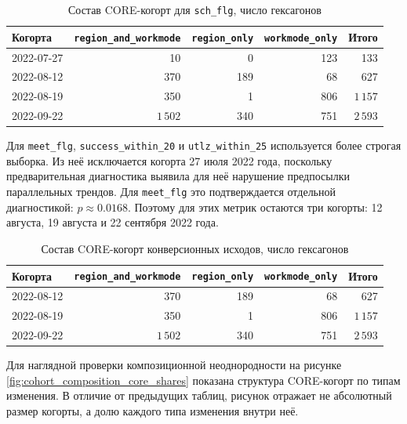\documentclass[14pt,a4paper]{extarticle}
\begin{document}
\begin{table}[H]
    \centering
    \caption{Состав CORE-когорт для \texttt{sch\_flg}, число гексагонов}
    \label{tab:cohort_composition_sch}
    \small
    \begin{tabular}{lrrrr}
        \toprule
        Когорта & \texttt{region\_and\_workmode} & \texttt{region\_only} & \texttt{workmode\_only} & Итого \\
        \midrule
        2022-07-27 & 10 & 0 & 123 & 133 \\
        2022-08-12 & 370 & 189 & 68 & 627 \\
        2022-08-19 & 350 & 1 & 806 & \(1\,157\) \\
        2022-09-22 & \(1\,502\) & 340 & 751 & \(2\,593\) \\
        \bottomrule
    \end{tabular}
\end{table}

Для \texttt{meet\_flg}, \texttt{success\_within\_20} и \texttt{utlz\_within\_25} используется более строгая выборка. Из неё исключается когорта 27 июля 2022 года, поскольку предварительная диагностика выявила для неё нарушение предпосылки параллельных трендов. Для \texttt{meet\_flg} это подтверждается отдельной диагностикой: \(p \approx 0.0168\). Поэтому для этих метрик остаются три когорты: 12 августа, 19 августа и 22 сентября 2022 года.

\begin{table}[H]
    \centering
    \caption{Состав CORE-когорт конверсионных исходов, число гексагонов}
    \label{tab:cohort_composition_conversion}
    \small
    \begin{tabular}{lrrrr}
        \toprule
        Когорта & \texttt{region\_and\_workmode} & \texttt{region\_only} & \texttt{workmode\_only} & Итого \\
        \midrule
        2022-08-12 & 370 & 189 & 68 & 627 \\
        2022-08-19 & 350 & 1 & 806 & \(1\,157\) \\
        2022-09-22 & \(1\,502\) & 340 & 751 & \(2\,593\) \\
        \bottomrule
    \end{tabular}
\end{table}

Для наглядной проверки композиционной неоднородности на рисунке \ref{fig:cohort_composition_core_shares} показана структура CORE-когорт по типам изменения. В отличие от предыдущих таблиц, рисунок отражает не абсолютный размер когорты, а долю каждого типа изменения внутри неё.
\end{document}
